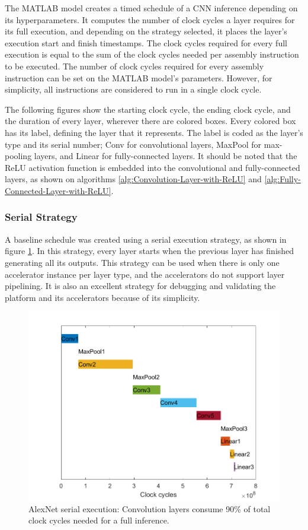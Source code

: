 The MATLAB model creates a timed schedule of a CNN inference depending on its hyperparameters. It computes the number of clock cycles a layer requires for its full execution, and depending on the strategy selected, it places the layer's execution start and finish timestamps. The clock cycles required for every full execution is equal to the sum of the clock cycles needed per assembly instruction to be executed. The number of clock cycles required for every assembly instruction can be set on the MATLAB model's parameters. However, for simplicity, all instructions are considered to run in a single clock cycle.

The following figures show the starting clock cycle, the ending clock cycle, and the duration of every layer, wherever there are colored boxes. Every colored box has its label, defining the layer that it represents. The label is coded as the layer's type and its serial number; Conv for convolutional layers, MaxPool for max-pooling layers, and Linear for fully-connected layers. It should be noted that the ReLU activation function is embedded into the convolutional and fully-connected layers, as shown on algorithms \ref{alg:Convolution-Layer-with-ReLU} and \ref{alg:Fully-Connected-Layer-with-ReLU}.

\subsubsection{Serial Strategy}
A baseline schedule was created using a serial execution strategy, as shown in figure \ref{fig:serial-execution}. In this strategy, every layer starts when the previous layer has finished generating all its outputs. This strategy can be used when there is only one accelerator instance per layer type, and the accelerators do not support layer pipelining. It is also an excellent strategy for debugging and validating the platform and its accelerators because of its simplicity.

\begin{figure} [H]
	\centering
	\includegraphics[width=\textwidth]{Images/Scheduling/Serial.png}
	\decoRule
	\caption[AlexNet serial execution]{AlexNet serial execution: Convolution layers consume 90\% of total clock cycles needed for a full inference.}
	\label{fig:serial-execution}
\end{figure}


